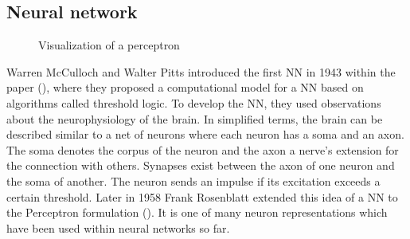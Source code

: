 \subsection{Neural network}
\label{sub:Neural-Network}

\begin{figure}[htbp]
    \centering
    \caption{Visualization of a perceptron}
    \label{fig:Perceptron-Visualisation}
\end{figure}
\noindent
Warren McCulloch and Walter Pitts introduced the first \gls{NN} in 1943 within the paper (\cite{mcculloch_logical_1943}), where they proposed a computational model for a \gls{NN} based on algorithms called threshold logic. To develop the \gls{NN}, they used observations about the neurophysiology of the brain. In simplified terms, the brain can be described similar to a net of neurons where each neuron has a soma and an axon. The soma denotes the corpus of the neuron and the axon a nerve’s extension for the connection with others. Synapses exist between the axon of one neuron and the soma of another. The neuron sends an impulse if its excitation exceeds a certain threshold. Later in 1958 Frank Rosenblatt extended this idea of a \gls{NN} to the Perceptron formulation (\cite{rosenblatt_perceptron_1958}). It is one of many neuron representations which have been used within neural networks so far.
